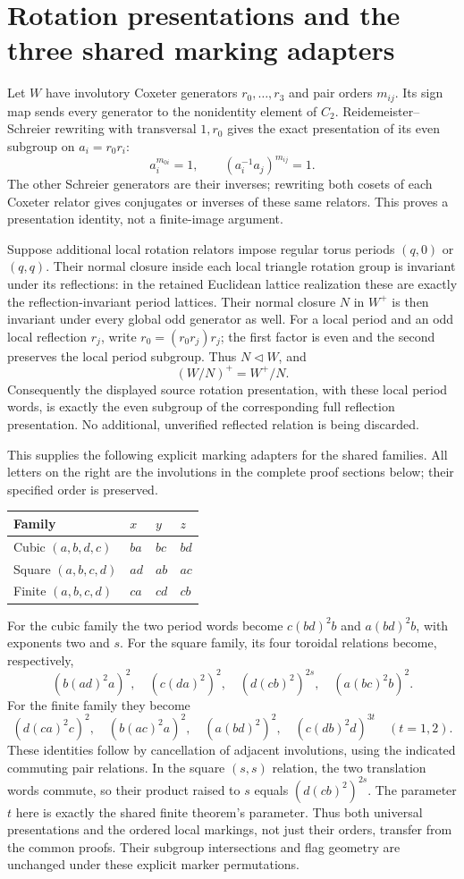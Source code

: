 \section{Rotation presentations and the three shared marking adapters}
Let $W$ have involutory Coxeter generators $r_0,\ldots,r_3$ and
pair orders $m_{ij}$. Its sign map sends every generator to the
nonidentity element of $C_2$. Reidemeister--Schreier rewriting with
transversal $1,r_0$ gives the exact presentation of its even subgroup
on $a_i=r_0r_i$:
\[
 a_i^{m_{0i}}=1,\qquad (a_i^{-1}a_j)^{m_{ij}}=1.
\]
The other Schreier generators are their inverses; rewriting both
cosets of each Coxeter relator gives conjugates or inverses of these
same relators. This proves a presentation identity, not a finite-image
argument.

Suppose additional local rotation relators impose regular torus periods
$(q,0)$ or $(q,q)$. Their normal closure inside each local triangle
rotation group is invariant under its reflections: in the retained
Euclidean lattice realization these are exactly the reflection-invariant
period lattices. Their normal closure $N$ in $W^+$ is then invariant
under every global odd generator as well. For a local period and an
odd local reflection $r_j$, write $r_0=(r_0r_j)r_j$; the first factor
is even and the second preserves the local period subgroup. Thus
$N\lhd W$, and
\[
 (W/N)^+=W^+/N.
\]
Consequently the displayed source rotation presentation, with these
local period words, is exactly the even subgroup of the corresponding
full reflection presentation. No additional, unverified reflected
relation is being discarded.

This supplies the following explicit marking adapters for the shared
families. All letters on the right are the involutions in the complete
proof sections below; their specified order is preserved.
\begin{center}\begin{tabular}{llll}\toprule
Family&$x$&$y$&$z$\\\midrule
Cubic $(a,b,d,c)$&$ba$&$bc$&$bd$\\
Square $(a,b,c,d)$&$ad$&$ab$&$ac$\\
Finite $(a,b,c,d)$&$ca$&$cd$&$cb$\\\bottomrule
\end{tabular}\end{center}
For the cubic family the two period words become
$c(bd)^2b$ and $a(bd)^2b$, with exponents two and $s$.
For the square family, its four toroidal relations become, respectively,
\[
 (b(ad)^2a)^2,\quad (c(da)^2)^2,\quad
 (d(cb)^2)^{2s},\quad (a(bc)^2b)^2.
\]
For the finite family they become
\[
 (d(ca)^2c)^2,\quad (b(ac)^2a)^2,\quad
 (a(bd)^2)^2,\quad (c(db)^2d)^{3t}\quad(t=1,2).
\]
These identities follow by cancellation of adjacent involutions, using
the indicated commuting pair relations. In the square $(s,s)$ relation,
the two translation words commute, so their product raised to $s$
equals $(d(cb)^2)^{2s}$. The parameter $t$ here is exactly the shared
finite theorem's parameter. Thus both universal presentations and the
ordered local markings, not just their orders, transfer from the common
proofs. Their subgroup intersections and flag geometry are unchanged
under these explicit marker permutations.
